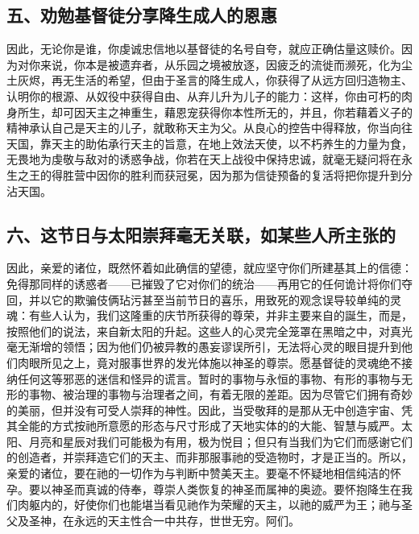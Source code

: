 
\subsection{五、劝勉基督徒分享降生成人的恩惠}

因此，无论你是谁，你虔诚忠信地以基督徒的名号自夸，就应正确估量这赎价。因为对你来说，你本是被遗弃者，从乐园之境被放逐，因疲乏的流徙而濒死，化为尘土灰烬，再无生活的希望，但由于圣言的降生成人，你获得了从远方回归造物主、认明你的根源、从奴役中获得自由、从弃儿升为儿子的能力：这样，你由可朽的肉身所生，却可因天主之神重生，藉恩宠获得你本性所无的，并且，你若藉着义子的精神承认自己是天主的儿子，就敢称天主为父。从良心的控告中得释放，你当向往天国，靠天主的助佑承行天主的旨意，在地上效法天使，以不朽养生的力量为食，无畏地为虔敬与敌对的诱惑争战，你若在天上战役中保持忠诚，就毫无疑问将在永生之王的得胜营中因你的胜利而获冠冕，因为那为信徒预备的复活将把你提升到分沾天国。\par


\subsection{六、这节日与太阳崇拜毫无关联，如某些人所主张的}

因此，亲爱的诸位，既然怀着如此确信的望德，就应坚守你们所建基其上的信德：免得那同样的诱惑者——已摧毁了它对你们的统治——再用它的任何诡计将你们夺回，并以它的欺骗伎俩玷污甚至当前节日的喜乐，用致死的观念误导较单纯的灵魂：有些人认为，我们这隆重的庆节所获得的尊荣，并非主要来自的誕生，而是，按照他们的说法，来自新太阳的升起。这些人的心灵完全笼罩在黑暗之中，对真光毫无渐增的领悟；因为他们仍被异教的愚妄谬误所引，无法将心灵的眼目提升到他们肉眼所见之上，竟对服事世界的发光体施以神圣的尊崇。愿基督徒的灵魂绝不接纳任何这等邪恶的迷信和怪异的谎言。暂时的事物与永恒的事物、有形的事物与无形的事物、被治理的事物与治理者之间，有着无限的差距。因为尽管它们拥有奇妙的美丽，但并没有可受人崇拜的神性。因此，当受敬拜的是那从无中创造宇宙、凭其全能的方式按祂所意愿的形态与尺寸形成了天地实体的的大能、智慧与威严。太阳、月亮和星辰对我们可能极为有用，极为悦目；但只有当我们为它们而感谢它们的创造者，并崇拜造它们的天主、而非那服事祂的受造物时，才是正当的。所以，亲爱的诸位，要在祂的一切作为与判断中赞美天主。要毫不怀疑地相信纯洁的怀孕。要以神圣而真诚的侍奉，尊崇人类恢复的神圣而属神的奥迹。要怀抱降生在我们肉躯内的，好使你们也能堪当看见祂作为荣耀的天主，以祂的威严为王；祂与圣父及圣神，在永远的天主性合一中共存，世世无穷。阿们。\par

